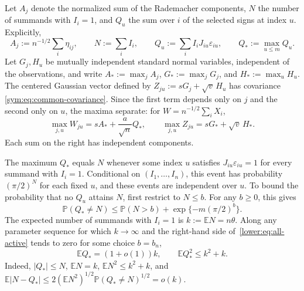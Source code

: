 \documentclass[11pt,letterpaper]{article}
\newenvironment{recovered}{}{}
\theoremstyle{remark}
\newcommand{\E}{\mathbb E}
\newcommand{\Pp}{\mathbb P}
\begin{document}
\begin{recovered}
Let \(A_j\) denote the normalized sum of the Rademacher components,
\(N\) the number of summands with \(I_i=1\), and \(Q_u\) the sum
over \(i\) of the selected signs at index \(u\). Explicitly,
\end{recovered}
\[
 A_j:=n^{-1/2}\sum_i\eta_{ij},\qquad
 N:=\sum_iI_i,\qquad Q_u:=\sum_iI_iJ_{iu}\varepsilon_{iu},
 \qquad Q_*:=\max_{u\le m}Q_u.
\]
Let \(G_j,H_u\) be mutually independent standard normal variables,
independent of the observations, and write
\(A_*:=\max_jA_j\), \(G_*:=\max_jG_j\), and \(H_*:=\max_uH_u\).
The centered Gaussian vector defined by
\(Z_{ju}:=sG_j+\sqrt v\,H_u\) has covariance
\eqref{sym:eq:common-covariance}. Since the first term depends only
on \(j\) and the second only on \(u\), the maxima separate:
for \(W=n^{-1/2}\sum_iX_i\),
\begin{equation}
 \max_{j,u}W_{ju}=sA_*+\frac a{\sqrt n}Q_*,
 \qquad \max_{j,u}Z_{ju}=sG_*+\sqrt v\,H_*.
 \label{sym:eq:common-maxima}
\end{equation}
Each sum on the right has independent components.

\begin{recovered}
The maximum \(Q_*\) equals \(N\) whenever some index \(u\) satisfies
\(J_{iu}\varepsilon_{iu}=1\) for every summand with \(I_i=1\).
Conditional on \((I_1,\ldots,I_n)\), this event has probability
\((\pi/2)^N\) for each fixed \(u\), and these events are independent
over \(u\). To bound the probability that no \(Q_u\) attains \(N\),
first restrict to \(N\le b\). For any \(b\ge0\), this gives
\end{recovered}
\begin{equation}
 \Pp(Q_*\ne N)\le \Pp(N>b)+\exp\{-m(\pi/2)^b\}.
 \label{lower:eq:all-active}
\end{equation}
{The expected number of summands with \(I_i=1\) is \(k:=\E N=n\theta\).}
Along any parameter sequence for which \(k\to\infty\) and the
right-hand side of~\eqref{lower:eq:all-active} tends to zero for
some choice \(b=b_n\),
\begin{equation}
 \E Q_*=(1+o(1))k,\qquad \E Q_*^2\le k^2+k.
 \label{lower:eq:activation-moments}
\end{equation}
\begin{recovered}
Indeed, \(|Q_*|\le N\), \(\E N=k\), \(\E N^2\le k^2+k\), and
\end{recovered}
\(\E|N-Q_*|\le2(\E N^2)^{1/2}\Pp(Q_*\ne N)^{1/2}=o(k)\).
\end{document}
